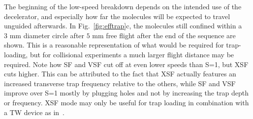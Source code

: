 \documentclass[%
 reprint,
 amsmath,amssymb,
 aps,
prl,
]{revtex4-1}
\begin{document}
The beginning of the low-speed breakdown depends on the intended use of the decelerator, and especially how far the molecules will be expected to travel unguided afterwards. 
In Fig.~\ref{fig:efftrap}c, the molecules still confined within a $3\text{ mm}$ diameter circle after $5\text{ mm}$ free flight after the end of the sequence are shown. 
This is a reasonable representation of what would be required for trap-loading, but for collisional experiments a much larger flight distance may be required.
Note how SF and VSF cut off at even lower speeds than S=1, but XSF cuts higher. 
This can be attributed to the fact that XSF actually features an increased transverse trap frequency relative to the others, while SF and VSF improve over S=1 mostly by plugging holes and not by increasing the trap depth or frequency.
XSF mode may only be useful for trap loading in combination with a TW device as in~\cite{Quintero-Perez2013}.
\end{document}
